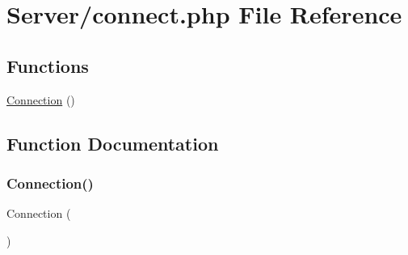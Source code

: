 \hypertarget{connect_8php}{}\section{Server/connect.php File Reference}
\label{connect_8php}
\subsection*{Functions}
\begin{DoxyCompactItemize}
\item 
\hyperlink{connect_8php_a346f4774f29e17e14e9b39fa9e2165e3}{Connection} ()
\end{DoxyCompactItemize}


\subsection{Function Documentation}
\mbox{\label{connect_8php_a346f4774f29e17e14e9b39fa9e2165e3}} 
\subsubsection{\texorpdfstring{Connection()}{Connection()}}
{\footnotesize\ttfamily Connection (\begin{DoxyParamCaption}{ }\end{DoxyParamCaption})}

